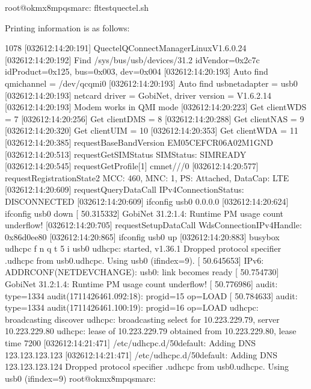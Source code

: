 \documentclass[letterpaper,10pt,openany,english]{sphinxmanual}
\begin{document}
\begin{sphinxVerbatim}[commandchars=\\\{\}]
root@ok\PYGZhy{}mx8mpq\PYGZhy{}smarc:\PYGZti{}\PYGZsh{} fltest\PYGZus{}quectel.sh \PYGZam{}
\end{sphinxVerbatim}

\sphinxAtStartPar
Printing information is as follows:

\begin{sphinxVerbatim}[commandchars=\\\{\}]
[1] 1078
[03\PYGZhy{}26\PYGZus{}12:14:20:191] Quectel\PYGZus{}QConnectManager\PYGZus{}Linux\PYGZus{}V1.6.0.24
[03\PYGZhy{}26\PYGZus{}12:14:20:192] Find /sys/bus/usb/devices/3\PYGZhy{}1.2 idVendor=0x2c7c idProduct=0x125, bus=0x003, dev=0x004
[03\PYGZhy{}26\PYGZus{}12:14:20:193] Auto find qmichannel = /dev/qcqmi0
[03\PYGZhy{}26\PYGZus{}12:14:20:193] Auto find usbnet\PYGZus{}adapter = usb0
[03\PYGZhy{}26\PYGZus{}12:14:20:193] netcard driver = GobiNet, driver version = V1.6.2.14
[03\PYGZhy{}26\PYGZus{}12:14:20:193] Modem works in QMI mode
[03\PYGZhy{}26\PYGZus{}12:14:20:223] Get clientWDS = 7
[03\PYGZhy{}26\PYGZus{}12:14:20:256] Get clientDMS = 8
[03\PYGZhy{}26\PYGZus{}12:14:20:288] Get clientNAS = 9
[03\PYGZhy{}26\PYGZus{}12:14:20:320] Get clientUIM = 10
[03\PYGZhy{}26\PYGZus{}12:14:20:353] Get clientWDA = 11
[03\PYGZhy{}26\PYGZus{}12:14:20:385] requestBaseBandVersion EM05CEFCR06A02M1G\PYGZus{}ND
[03\PYGZhy{}26\PYGZus{}12:14:20:513] requestGetSIMStatus SIMStatus: SIM\PYGZus{}READY
[03\PYGZhy{}26\PYGZus{}12:14:20:545] requestGetProfile[1] cmnet///0
[03\PYGZhy{}26\PYGZus{}12:14:20:577] requestRegistrationState2 MCC: 460, MNC: 1, PS: Attached, DataCap: LTE
[03\PYGZhy{}26\PYGZus{}12:14:20:609] requestQueryDataCall IPv4ConnectionStatus: DISCONNECTED
[03\PYGZhy{}26\PYGZus{}12:14:20:609] ifconfig usb0 0.0.0.0
[03\PYGZhy{}26\PYGZus{}12:14:20:624] ifconfig usb0 down
[   50.315332] GobiNet 3\PYGZhy{}1.2:1.4: Runtime PM usage count underflow!
[03\PYGZhy{}26\PYGZus{}12:14:20:705] requestSetupDataCall WdsConnectionIPv4Handle: 0x86d0ee80
[03\PYGZhy{}26\PYGZus{}12:14:20:865] ifconfig usb0 up
[03\PYGZhy{}26\PYGZus{}12:14:20:883] busybox udhcpc \PYGZhy{}f \PYGZhy{}n \PYGZhy{}q \PYGZhy{}t 5 \PYGZhy{}i usb0
udhcpc: started, v1.36.1
Dropped protocol specifier \PYGZsq{}.udhcpc\PYGZsq{} from \PYGZsq{}usb0.udhcpc\PYGZsq{}. Using \PYGZsq{}usb0\PYGZsq{} (ifindex=9).
[   50.645653] IPv6: ADDRCONF(NETDEV\PYGZus{}CHANGE): usb0: link becomes ready
[   50.754730] GobiNet 3\PYGZhy{}1.2:1.4: Runtime PM usage count underflow!
[   50.776986] audit: type=1334 audit(1711426461.092:18): prog\PYGZhy{}id=15 op=LOAD
[   50.784633] audit: type=1334 audit(1711426461.100:19): prog\PYGZhy{}id=16 op=LOAD
udhcpc: broadcasting discover
udhcpc: broadcasting select for 10.223.229.79, server 10.223.229.80
udhcpc: lease of 10.223.229.79 obtained from 10.223.229.80, lease time 7200
[03\PYGZhy{}26\PYGZus{}12:14:21:471] /etc/udhcpc.d/50default: Adding DNS 123.123.123.123
[03\PYGZhy{}26\PYGZus{}12:14:21:471] /etc/udhcpc.d/50default: Adding DNS 123.123.123.124
Dropped protocol specifier \PYGZsq{}.udhcpc\PYGZsq{} from \PYGZsq{}usb0.udhcpc\PYGZsq{}. Using \PYGZsq{}usb0\PYGZsq{} (ifindex=9)
root@ok\PYGZhy{}mx8mpq\PYGZhy{}smarc:\PYGZti{}\PYGZsh{}
\end{sphinxVerbatim}
\end{document}

